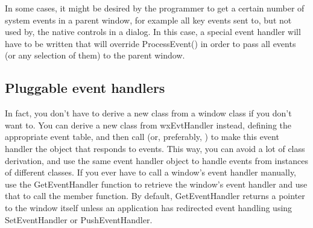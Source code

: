 In some cases, it might be desired by the programmer to get a certain number
of system events in a parent window, for example all key events sent to, but not
used by, the native controls in a dialog. In this case, a special event handler
will have to be written that will override ProcessEvent() in order to pass
all events (or any selection of them) to the parent window.

%
% 

\subsection{Pluggable event handlers}

In fact, you don't have to derive a new class from a window class
if you don't want to. You can derive a new class from wxEvtHandler instead,
defining the appropriate event table, and then call
\rtfsp{} (or, preferably,
\rtfsp{}) to make this
event handler the object that responds to events. This way, you can avoid
a lot of class derivation, and use the same event handler object to
handle events from instances of different classes. If you ever have to call a window's event handler
manually, use the GetEventHandler function to retrieve the window's event handler and use that
to call the member function. By default, GetEventHandler returns a pointer to the window itself
unless an application has redirected event handling using SetEventHandler or PushEventHandler.


